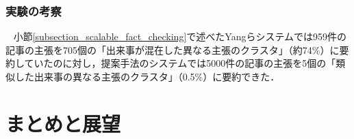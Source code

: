 \documentclass[12pt,a4j]{jreport}
\begin{document}
\subsection{実験の考察}
~
小節\ref{subsection_scalable_fact_checking}で述べたYangらシステムでは959件の記事の主張を705個の「出来事が混在した異なる主張のクラスタ」（約74\%）に要約していたのに対し，提案手法のシステムでは5000件の記事の主張を5個の「類似した出来事の異なる主張のクラスタ」（0.5\%）に要約できた．









\chapter{まとめと展望}
\end{document}
